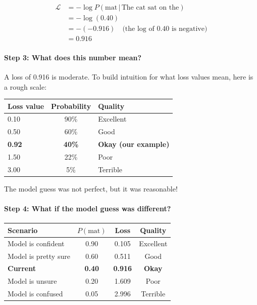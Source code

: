 \begin{chapterenv}
\begin{align*}
\mathcal{L} &= -\log P(\text{mat} \,|\, \text{The cat sat on the}) \\
&= -\log(0.40) \\
&= -(-0.916) \quad \text{(the log of 0.40 is negative)} \\
&= 0.916
\end{align*}

\paragraph{Step 3: What does this number mean?}

A loss of 0.916 is moderate. To build intuition for what loss values mean, here is a rough scale:

\begin{center}
\begin{tabular}{lcl}
\toprule
\textbf{Loss value} & \textbf{Probability} & \textbf{Quality} \\
\midrule
0.10 & 90\% & Excellent \\
0.50 & 60\% & Good \\
\textbf{0.92} & \textbf{40\%} & \textbf{Okay (our example)} \\
1.50 & 22\% & Poor \\
3.00 & 5\% & Terrible \\
\bottomrule
\end{tabular}
\end{center}

The model guess was not perfect, but it was reasonable!

\paragraph{Step 4: What if the model guess was different?}

\begin{center}
\begin{tabular}{lccc}
\toprule
\textbf{Scenario} & \textbf{$P(\text{mat})$} & \textbf{Loss} & \textbf{Quality} \\
\midrule
Model is confident & 0.90 & 0.105 & Excellent \\
Model is pretty sure & 0.60 & 0.511 & Good \\
\textbf{Current} & \textbf{0.40} & \textbf{0.916} & \textbf{Okay} \\
Model is unsure & 0.20 & 1.609 & Poor \\
Model is confused & 0.05 & 2.996 & Terrible \\
\bottomrule
\end{tabular}
\end{center}


\end{chapterenv}
